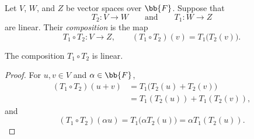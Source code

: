 Let $V$, $W$, and $Z$ be vector spaces over $\bb{F}$. Suppose that
\[
  T_2\colon V\longrightarrow W
  \qquad\text{and}\qquad
  T_1\colon W\longrightarrow Z
\]
are linear. Their \emph{composition} is the map
\[
  T_1\circ T_2\colon V\longrightarrow Z,
  \qquad
  (T_1\circ T_2)(v)=T_1\bigl(T_2(v)\bigr).
\]

\begin{proposition}
  The composition $T_1\circ T_2$ is linear.
\end{proposition}

\begin{proof}
  For $u,v\in V$ and $\alpha\in\bb{F}$,
  \begin{align*}
    (T_1\circ T_2)(u+v)
    &=T_1\bigl(T_2(u)+T_2(v)\bigr) \\
    &=T_1(T_2(u))+T_1(T_2(v)),
  \end{align*}
  and
  \[
    (T_1\circ T_2)(\alpha u)
    =T_1\bigl(\alpha T_2(u)\bigr)
    =\alpha T_1(T_2(u)).
  \]
\end{proof}
